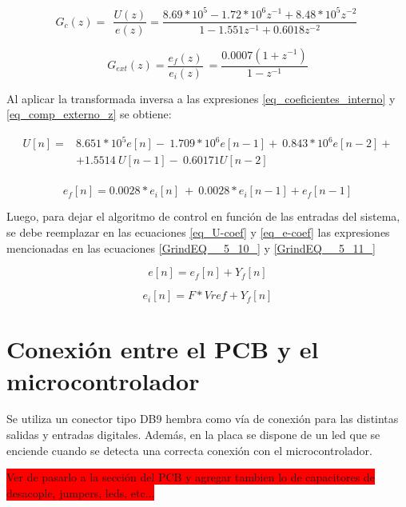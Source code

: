 %
%

\begin{equation} \label{eq_coeficientes_interno} 
	G_c(z)=\ \ \frac{U(z)}{e(z)}=\frac{8.69*10^5- 1.72*10^6z^{-1} + 8.48*10^5z^{-2}}{1-1.551 z^{-1} + 0.6018 z^{-2}}\  
\end{equation} 

\begin{equation} \label{eq_comp_externo_z} 
	G_{ext}(z)=\frac{e_f(z)}{e_i(z)}\ =\frac{0.0007(1+z^{-1})}{1-z^{-1}} 
\end{equation} 

Al aplicar la transformada inversa a las expresiones \ref{eq_coeficientes_interno} y \ref{eq_comp_externo_z} se obtiene:

\begin{equation} 
	\begin{aligned}\label{eq_U-coef}
		U[n]=&8.651*10^5e[n]-\ 1.709*10^6e[n-1]+\ 0.843*10^6e[n-2]+\\
		&+1.5514\ U[n-1]-\ 0.60171U[n-2]\\ 
	\end{aligned}
\end{equation}

\begin{equation} \label{eq_e-coef} 
	e_f[n]=0.0028*e_i[n]\ +\ {0.0028*e}_i[n-1]+e_f[n-1] 
\end{equation} 

Luego, para dejar el algoritmo de control en funci\'{o}n de las entradas del sistema, se debe reemplazar en las ecuaciones \ref{eq_U-coef} y \ref{eq_e-coef} las expresiones mencionadas en las ecuaciones \ref{GrindEQ__5_10_} y \ref{GrindEQ__5_11_}

\begin{equation} \label{GrindEQ__5_10_} 
	e[n]=e_f[n]+Y_f[n] 
\end{equation} 

\begin{equation} \label{GrindEQ__5_11_} 
	e_i[n]=F*Vref+Y_f[n] 
\end{equation} 


\section{Conexi\'{o}n entre el PCB y el microcontrolador}

 Se utiliza un conector tipo DB9 hembra como v\'{i}a de conexi\'{o}n para las distintas salidas y entradas digitales. Adem\'{a}s, en la placa se dispone de un led que se enciende cuando  se detecta una correcta conexi\'{o}n con el microcontrolador.
 
 \colorbox{red}{Ver de pasarlo a la sección del PCB y agregar tambien lo de capacitores de desacople, jumpers, leds, etc...}







